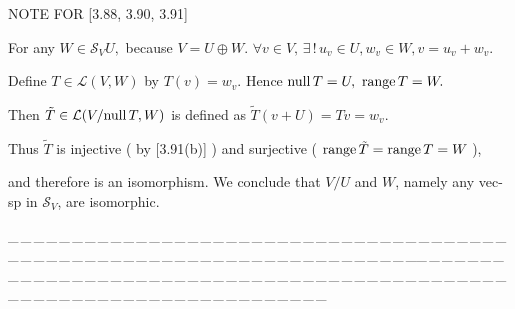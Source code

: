 \documentclass[a4paper, 11pt, UTF8]{article}
\def\range{\textup{range}\,}
\def\null{\textup{null\,}}
\def\Lm{\mathcal{L}}
\def\Nbp{$\,{\timesbf N}$^+}
\begin{document}
\begin{large}
{\timesbf\Large N{\normalsize OTE} F{\normalsize OR} {\large [3.88, 3.90, 3.91]}}\par\quad
For any $W\in\mathcal{S}_V U,$ because $V=U\oplus W.$ $\forall v\in V,\,\exists\,!\,u_v\in U,w_v\in W,v=u_v+w_v.$\par\quad
Define $T\in\Lm(V,W)$ by $T(v)=w_v.$ Hence $\null T=U,\,\,\range T=W.$\par\quad
Then $\tilde{T}\in\Lm(V/\null T,W)$ is defined as $\tilde{T}(v+U)=Tv=w_v.$\par\quad
Thus $\tilde{T}$ is injective ( by [3.91(b)] ) and surjective ( $\range\tilde{T}=\range T=W$ ),\par\quad
and therefore is an isomorphism. We conclude that $V/U$ and $W$, namely any vec-sp in $\mathcal{S}_V$, are isomorphic.\par
{\tiny \_\,\_\,\_\,\_\,\_\,\_\,\_\,\_\,\_\,\_\,\_\,\_\,\_\,\_\,\_\,\_\,\_\,\_\,\_\,\_\,\_\,\_\,\_\,\_\,\_\,\_\,\_\,\_\,\_\,\_\,\_\,\_\,\_\,\_\,\_\,\_\,\_\,\_\,\_\,\_\,\_\,\_\,\_\,\_\,\_\,\_\,\_\,\_\,\_\,\_\,\_\,\_\,\_\,\_\,\_\,\_\,\_\,\_\,\_\,\_\,\_\,\_\,\_\,\_\,\_\,\_\,\_\,\_\,\_\,\_\,\_\_\,\_\,\_\,\_\,\_\,\_\,\_\,\_\,\_\,\_\,\_\,\_\,\_\,\_\,\_\,\_\,\_\,\_\,\_\,\_\,\_\,\_\,\_\,\_\,\_\,\_\,\_\,\_\,\_\,\_\,\_\,\_\,\_\,\_\,\_\,\_\,\_\,\_\,\_\,\_\,\_\,\_\,\_\,\_\,\_\,\_\,\_\,\_\,\_\,\_\,\_\,\_\,\_\,\_\,\_\,\_\,\_\,\_\,\_\,\_\,\_\,\_\,\_\,\_\,\_\,\_\,\_\,\_\,\_\,\_\,\_}\par


\end{large}
\end{document}
